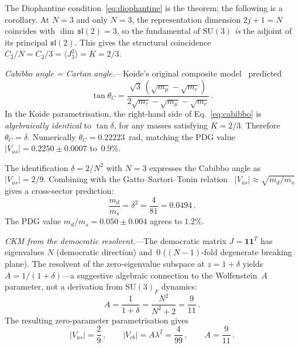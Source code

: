 \documentclass[aps,prl,twocolumn,showpacs,preprintnumbers,superscriptaddress]{revtex4-2}
\newcommand{\SU}{\mathrm{SU}}
\begin{document}
The Diophantine condition~\eqref{eq:diophantine} is the
theorem; the following is a corollary.
At $N = 3$ and only $N = 3$,
the representation dimension $2j+1 = N$ coincides with
$\dim\,\mathfrak{sl}(2) = 3$, so the fundamental of $\SU(3)$
\emph{is} the adjoint of its principal $\mathfrak{sl}(2)$.
This gives the structural coincidence
$C_2/N = C_2/3 = \langle J_3^2\rangle = K = 2/3$.


\textit{Cabibbo angle = Cartan angle.}---Koide's original
composite model~\cite{Koide:1983} predicted
\begin{equation}
  \tan\theta_C = \frac{\sqrt{3}\,(\sqrt{m_\mu}-\sqrt{m_e})}
  {2\sqrt{m_\tau}-\sqrt{m_\mu}-\sqrt{m_e}}\,.
  \label{eq:cabibbo}
\end{equation}
In the Koide parametrisation, the right-hand side of
Eq.~\eqref{eq:cabibbo} is \emph{algebraically identical}
to $\tan\delta$, for any masses satisfying $K = 2/3$.
Therefore $\theta_C = \delta$.
Numerically $\theta_C = 0.22223$~rad, matching the PDG
value~\cite{PDG:2024} $|V_{us}| = 0.2250 \pm 0.0007$
to~$0.9\%$.

The identification $\delta = 2/N^2$ with $N = 3$
expresses the Cabibbo angle as $|V_{us}| = 2/9$.
Combining with the Gatto--Sartori--Tonin
relation~\cite{GST:1968} $|V_{us}| \approx \sqrt{m_d/m_s}$
gives a cross-sector prediction:
\begin{equation}
  \frac{m_d}{m_s} = \delta^2 = \frac{4}{81} = 0.0494\,.
  \label{eq:md_ms}
\end{equation}
The PDG value $m_d/m_s = 0.050 \pm 0.004$ agrees to $1.2\%$.


\textit{CKM from the democratic resolvent.}---The democratic
matrix $J = \mathbf{1}\mathbf{1}^T$ has eigenvalues $N$
(democratic direction) and~$0$ ($(N{-}1)$-fold degenerate
breaking plane).
The resolvent of the zero-eigenvalue subspace at
$z = 1 + \delta$ yields $A = 1/(1+\delta)$---a suggestive
algebraic connection to the Wolfenstein~$A$ parameter, not a
derivation from $\SU(3)_F$ dynamics:
\begin{equation}
  A = \frac{1}{1+\delta} = \frac{N^2}{N^2+2} = \frac{9}{11}\,.
  \label{eq:A}
\end{equation}
The resulting zero-parameter parametrisation gives
\begin{equation}
  |V_{us}| = \frac{2}{9}\,,\qquad
  |V_{cb}| = A\lambda^2 = \frac{4}{99}\,,\qquad
  A = \frac{9}{11}\,.
  \label{eq:ckm}
\end{equation}
\end{document}
